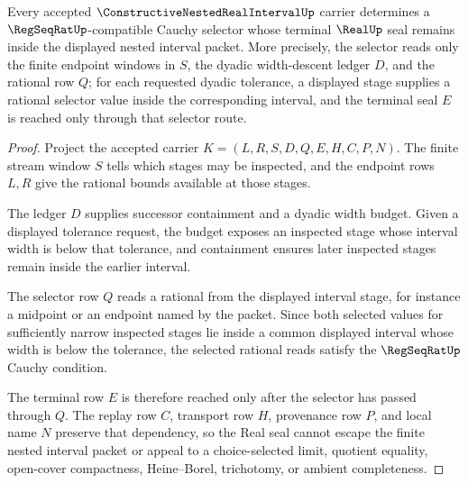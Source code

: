 \begin{theorem}\label{thm:constructive-nested-real-interval-cauchy-selector}
Every accepted $\ConstructiveNestedRealIntervalUp$ carrier determines a $\RegSeqRatUp$-compatible Cauchy selector whose terminal $\RealUp$ seal remains inside the displayed nested interval packet. More precisely, the selector reads only the finite endpoint windows in $S$, the dyadic width-descent ledger $D$, and the rational row $Q$; for each requested dyadic tolerance, a displayed stage supplies a rational selector value inside the corresponding interval, and the terminal seal $E$ is reached only through that selector route.
\end{theorem}
\begin{proof}
Project the accepted carrier $K=(L,R,S,D,Q,E,H,C,P,N)$. The finite stream window $S$ tells which stages may be inspected, and the endpoint rows $L,R$ give the rational bounds available at those stages.

The ledger $D$ supplies successor containment and a dyadic width budget. Given a displayed tolerance request, the budget exposes an inspected stage whose interval width is below that tolerance, and containment ensures later inspected stages remain inside the earlier interval.

The selector row $Q$ reads a rational from the displayed interval stage, for instance a midpoint or an endpoint named by the packet. Since both selected values for sufficiently narrow inspected stages lie inside a common displayed interval whose width is below the tolerance, the selected rational reads satisfy the $\RegSeqRatUp$ Cauchy condition.

The terminal row $E$ is therefore reached only after the selector has passed through $Q$. The replay row $C$, transport row $H$, provenance row $P$, and local name $N$ preserve that dependency, so the Real seal cannot escape the finite nested interval packet or appeal to a choice-selected limit, quotient equality, open-cover compactness, Heine--Borel, trichotomy, or ambient completeness.
\end{proof}



